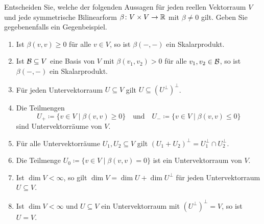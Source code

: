 \documentclass[a4paper, 10pt]{scrartcl}
\begin{document}
\begin{question}
  Entscheiden Sie, welche der folgenden Aussagen für jeden reellen Vektorraum $V$ und jede symmetrische Bilinearform $\beta \colon V \times V \to \mathbb{R}$ mit $\beta \neq 0$ gilt.
  Geben Sie gegebenenfalls ein Gegenbeispiel.
  \begin{enumerate}[leftmargin=*]
    \item
      Ist $\beta(v, v) \geq 0$ für alle $v \in V$, so ist $\beta(-, -)$ ein Skalarprodukt.
    \item
      Ist $\mathcal{B} \subseteq V$ eine Basis von $V$ mit $\beta(v_1, v_2) > 0$ für alle $v_1, v_2 \in \mathcal{B}$, so ist $\beta(-, -)$ ein Skalarprodukt.
    \item
      Für jeden Untervektorraum $U \subseteq V$ gilt $U \subseteq (U^\perp)^\perp$.
    \item
      Die Teilmengen
      \[
        U_+ \coloneqq \{ v \in V \mid \beta(v, v) \geq 0 \}
        \quad\text{und}\quad
        U_- \coloneqq \{ v \in V \mid \beta(v, v) \leq 0 \}
      \]
      sind Untervektorräume von $V$.
    \item
      Für alle Untervektorräume $U_1, U_2 \subseteq V$ gilt $(U_1 + U_2)^\perp = U_1^\perp \cap U_2^\perp$.
    \item
      Die Teilmenge $U_0 \coloneqq \{ v \in V \mid \beta(v, v) = 0 \}$ ist ein Untervektorraum von $V$.
    \item
      Ist $\dim V < \infty$, so gilt $\dim V = \dim U + \dim U^\perp$ für jeden Untervektorraum $U \subseteq V$.
    \item
      Ist $\dim V < \infty$ und $U \subseteq V$ ein Untervektorraum mit $(U^\perp)^\perp = V$, so ist $U = V$.
  \end{enumerate}
\end{question}
\end{document}
